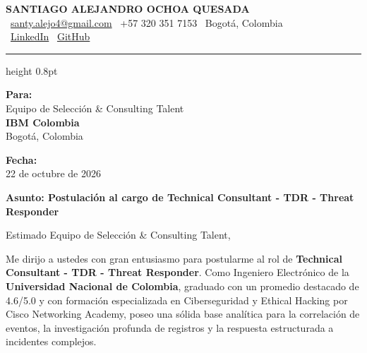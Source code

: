 \documentclass[11pt,a4paper]{article}
\begin{document}
\thispagestyle{empty}
\color{darktext}

\begin{center}
    {\Huge \bfseries\color{accent} SANTIAGO ALEJANDRO OCHOA QUESADA} \\[6pt]
    {\small\color{darktext}
    \faEnvelope\ \href{mailto:santy.alejo4@gmail.com}{santy.alejo4@gmail.com}
    \quad\textcolor{bulletline}{\textbar}\quad
    \faPhone\ +57 320 351 7153
    \quad\textcolor{bulletline}{\textbar}\quad
    \faMapMarker*\ Bogotá, Colombia \\[4pt]
    \faLinkedin\ \href{https://linkedin.com/in/santiago-alejandro-ochoa-quesada-a07a18288/}{LinkedIn}
    \quad\textcolor{bulletline}{\textbar}\quad
    \faGithub\ \href{https://github.com/Sochoaq}{GitHub}
    }
\end{center}
\vspace{2pt}
{\color{bulletline}\hrule height 0.8pt}
\vspace{10pt}

\noindent
\begin{minipage}[t]{0.62\textwidth}
    \textbf{\color{accent} Para:}\\
    Equipo de Selección \& Consulting Talent\\
    \textbf{IBM Colombia}\\
    Bogotá, Colombia
\end{minipage}
\hfill
\begin{minipage}[t]{0.35\textwidth}\raggedleft
    \textbf{\color{accent} Fecha:}\\
    22 de octubre de 2026
\end{minipage}

\vspace{6pt}
\noindent
{\large\bfseries\color{accent} Asunto: Postulación al cargo de Technical Consultant - TDR - Threat Responder}
\vspace{2pt}

\noindent Estimado Equipo de Selección \& Consulting Talent,

Me dirijo a ustedes con gran entusiasmo para postularme al rol de \textbf{Technical Consultant - TDR - Threat Responder}. Como Ingeniero Electrónico de la \textbf{Universidad Nacional de Colombia}, graduado con un promedio destacado de 4.6/5.0 y con formación especializada en Ciberseguridad y Ethical Hacking por Cisco Networking Academy, poseo una sólida base analítica para la correlación de eventos, la investigación profunda de registros y la respuesta estructurada a incidentes complejos.
\end{document}
